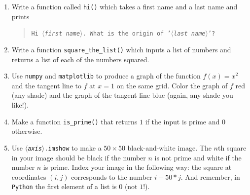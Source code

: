 \documentclass[letter]{article}
\newcommand{\var}[1]{{$\langle$\it #1$\rangle$}}
\begin{document}
\begin{enumerate}
\begin{enumerate}
				Alternatively, if you have installed {\tt Python} and Jupyter notebooks on your local computer, you may
				clone the notebook from \url{https://github.com/bigfatbernie/apm348-f26/tree/main/start here}

				When you have finished going through the {\tt intro} notebook, clone the {\tt exercises} notebook
				and do the rest of the exercises. \emph{You will only turn in the {\tt exercises} notebook to Gradescope.
				The {\tt intro} notebook is just for your edification}.
				
				\url{https://utoronto.syzygy.ca/jupyter/user-redirect/git-pull?repo=https://github.com/bigfatbernie/apm348-f26&subPath=start here/starthere-exercises.ipynb}

				{\textbf{Note:}} {The \texttt{starthere-exercises.ipynb} file has \emph{stubs} for each of
				the programming tasks. That is, there are pre-defined functions in the notebook with the correct format
				and which accept the correct arguments. \textbf{These functions
				do not produce the correct output.} Your job is to modify these functions so that they produce the correct output.}
			\item Write a function called {\tt hi()} which takes a first name and a last name and prints 
				\begin{quote}{\tt Hi \var{first name}. What is the origin of '\var{last name}'?}\end{quote}
			\item Write a function \verb|square_the_list()| which inputs a list of numbers and returns
				a list of each of the numbers squared.
			\item Use {\tt numpy} and {\tt matplotlib} to produce a graph of the function $f(x)=x^2$ and the tangent
				line to $f$ at $x=1$ on the same grid. Color the graph of $f$ red (any shade) and the graph of the
				tangent line blue (again, any shade you like!). 
			\item Make a function \verb|is_prime()| that returns $1$ if the input is prime and $0$ otherwise.
			\item Use {\tt \var{axis}.imshow} to make a $50\times 50$ black-and-white image. The $n$th square in your
				image should be black if the number $n$ is not prime and white if the number $n$ is prime. Index your image
				in the following way: the square at coordinates $(i,j)$ corresponds to the number $i+50*j$. 
				And remember, in {\tt Python} the first element of a list is $0$ (not $1$!).
		\end{enumerate}
	\end{enumerate}
\end{document}
